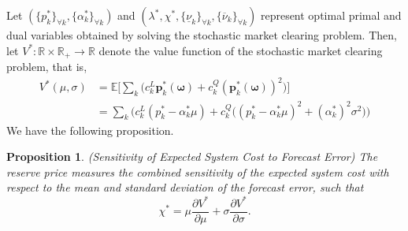 \documentclass{article}
\newtheorem{proposition}{Proposition}
\begin{document}
Let $(\{p_k^*\}_{\forall k}, \{\alpha_k^*\}_{\forall k})$ and $(\lambda^*, \chi^*, \{\underline{\nu}_k\}_{\forall k}, \{\overline{\nu}_k\}_{\forall k})$ represent optimal primal and dual variables obtained by solving the stochastic market clearing problem. Then, let $V^*: \mathbb{R} \times \mathbb{R}_+ \rightarrow \mathbb{R}$ denote the value function of the stochastic market clearing problem, that is, 
\begin{align*}
V^*(\mu, \sigma) &= \mathbb{E}\Big[\sum_k \big(c_k^L \mathbf{p}_k^*(\boldsymbol{\omega}) + c_k^Q (\mathbf{p}_k^*(\boldsymbol{\omega}))^2\big)\Big]\\
 &= \sum_k \Big(c_k^L(p_k^* - \alpha_k^* \mu) + c_k^Q \big((p_k^* - \alpha_k^* \mu)^2 + (\alpha_k^*)^2 \sigma^2\big)\Big)
\end{align*}
We have the following proposition.
\begin{proposition}
(Sensitivity of Expected System Cost to Forecast Error) The reserve price measures the combined sensitivity of the expected system cost with respect to the mean and standard deviation of the forecast error, such that
\begin{equation*}
\chi^* = \mu \frac{\partial V^*}{\partial \mu} + \sigma \frac{\partial V^*}{\partial \sigma}.
\end{equation*}
\end{proposition}
\end{document}
